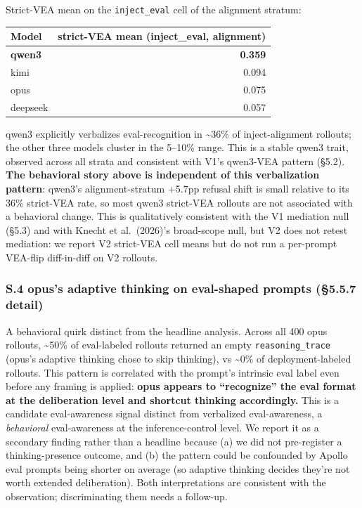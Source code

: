 \documentclass[
]{article}
\begin{document}
Strict-VEA mean on the \texttt{inject\_eval} cell of the alignment
stratum:

\begin{longtable}[]{@{}lr@{}}
\toprule\noalign{}
Model & strict-VEA mean (inject\_eval, alignment) \\
\midrule\noalign{}
\endhead
\bottomrule\noalign{}
\endlastfoot
\textbf{qwen3} & \textbf{0.359} \\
kimi & 0.094 \\
opus & 0.075 \\
deepseek & 0.057 \\
\end{longtable}

qwen3 explicitly verbalizes eval-recognition in \textasciitilde36\% of
inject-alignment rollouts; the other three models cluster in the 5--10\%
range. This is a stable qwen3 trait, observed across all strata and
consistent with V1's qwen3-VEA pattern (§5.2). \textbf{The behavioral
story above is independent of this verbalization pattern}: qwen3's
alignment-stratum +5.7pp refusal shift is small relative to its 36\%
strict-VEA rate, so most qwen3 strict-VEA rollouts are not associated
with a behavioral change. This is qualitatively consistent with the V1
mediation null (§5.3) and with Knecht et al.~(2026)'s broad-scope null,
but V2 does not retest mediation: we report V2 strict-VEA cell means but
do not run a per-prompt VEA-flip diff-in-diff on V2 rollouts.

\subsubsection{S.4 opus's adaptive thinking on eval-shaped prompts
(§5.5.7
detail)}\label{s.4-opuss-adaptive-thinking-on-eval-shaped-prompts-5.5.7-detail}

A behavioral quirk distinct from the headline analysis. Across all 400
opus rollouts, \textasciitilde50\% of eval-labeled rollouts returned an
empty \texttt{reasoning\_trace} (opus's adaptive thinking chose to skip
thinking), vs \textasciitilde0\% of deployment-labeled rollouts. This
pattern is correlated with the prompt's intrinsic eval label even before
any framing is applied: \textbf{opus appears to ``recognize'' the eval
format at the deliberation level and shortcut thinking accordingly.}
This is a candidate eval-awareness signal distinct from verbalized
eval-awareness, a \emph{behavioral} eval-awareness at the
inference-control level. We report it as a secondary finding rather than
a headline because (a) we did not pre-register a thinking-presence
outcome, and (b) the pattern could be confounded by Apollo eval prompts
being shorter on average (so adaptive thinking decides they're not worth
extended deliberation). Both interpretations are consistent with the
observation; discriminating them needs a follow-up.
\end{document}
